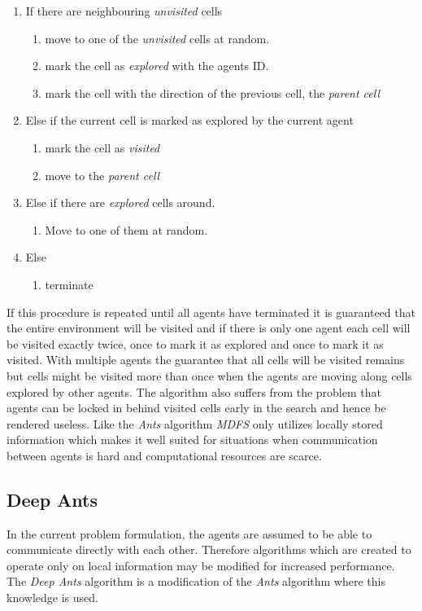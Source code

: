 \documentclass{article}
\begin{document}
\begin{enumerate}
\item If there are neighbouring \textit{unvisited} cells
  \begin{enumerate}
  \item move to one of the \textit{unvisited} cells at random.
  \item mark the cell as \textit{explored} with the agents ID.
  \item mark the cell with the direction of the previous cell, the \textit{parent cell} 
  \end{enumerate}
\item Else if the current cell is marked as explored by the current agent
  \begin{enumerate}
  \item mark the cell as \textit{visited}
  \item move to the \textit{parent cell}
  \end{enumerate}
\item Else if there are \textit{explored} cells around.
  \begin{enumerate}
  \item Move to one of them at random.
  \end{enumerate}
\item Else
  \begin{enumerate}
  \item terminate
  \end{enumerate}
\end{enumerate}

If this procedure is repeated until all agents have terminated it is guaranteed
that the entire environment will be visited and if there is only one agent each
cell will be visited exactly twice, once to mark it as explored and once to
mark it as visited. With multiple agents the guarantee that all cells will be
visited remains but cells might be visited more than once when the agents are
moving along cells explored by other agents. The algorithm also suffers from the
problem that agents can be locked in behind visited cells early in the search
and hence be rendered useless. Like the \textit{Ants} algorithm \textit{MDFS}
only utilizes locally stored information which makes it well suited for
situations when communication between agents is hard and computational resources
are scarce.
\subsection{Deep Ants}
In the current problem formulation, the agents are assumed to be able to
communicate directly with each other. Therefore algorithms which are created to
operate only on local information may be modified for increased performance. The
\textit{Deep Ants} algorithm is a modification of the \textit{Ants} algorithm
where this knowledge is used.
\end{document}
